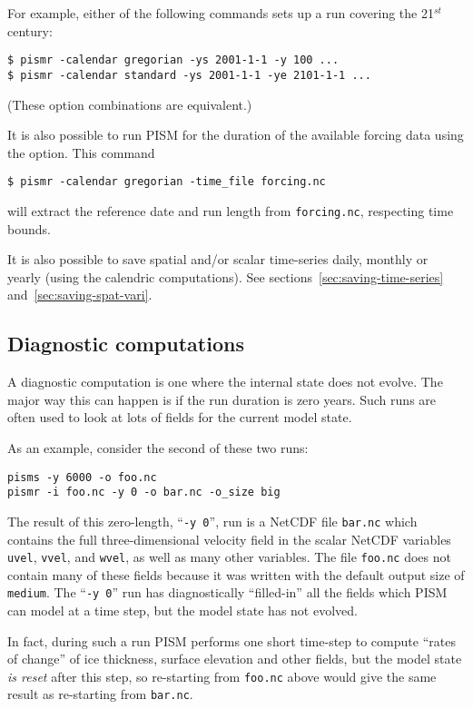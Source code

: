 For example, either of the following commands sets up a run covering the 21$^{st}$ century:
\begin{verbatim}
$ pismr -calendar gregorian -ys 2001-1-1 -y 100 ...
$ pismr -calendar standard -ys 2001-1-1 -ye 2101-1-1 ...
\end{verbatim}
(These option combinations are equivalent.)

It is also possible to run PISM for the duration of the available forcing data using the  option.
This command
\begin{verbatim}
$ pismr -calendar gregorian -time_file forcing.nc
\end{verbatim} %
will extract the reference date and run length from \texttt{forcing.nc}, respecting time bounds.

It is also possible to save spatial and/or scalar time-series daily, monthly or
yearly (using the calendric computations). See sections~\ref{sec:saving-time-series}
and~\ref{sec:saving-spat-vari}.

\subsection{Diagnostic computations}
\label{sec:diagnostic-computations}

A diagnostic computation is one where the internal state does not evolve.  The major way this can happen is if the run duration is zero years.  Such runs are often used to look at lots of fields for the current model state.

As an example, consider the second of these two runs:
\begin{verbatim}
pisms -y 6000 -o foo.nc
pismr -i foo.nc -y 0 -o bar.nc -o_size big
\end{verbatim}

\noindent The result of this zero-length, ``\texttt{-y 0}'', run is a NetCDF file \texttt{bar.nc} which contains the full three-dimensional velocity field in the scalar NetCDF variables \texttt{uvel}, \texttt{vvel}, and \texttt{wvel}, as well as many other variables.  The file \texttt{foo.nc} does not contain many of these fields because it was written with the default output size of \texttt{medium}.  The ``\texttt{-y 0}'' run has diagnostically ``filled-in'' all the fields which PISM can model at a time step, but the model state has not evolved.

In fact, during such a run PISM performs one short time-step to compute ``rates of change'' of ice thickness, surface elevation and other fields, but the model state \emph{is reset} after this step, so re-starting from \texttt{foo.nc} above would give the same result as re-starting from \texttt{bar.nc}.

